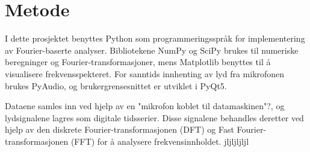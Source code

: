 \section{Metode}
I dette prosjektet benyttes Python som programmeringsspråk for implementering av Fourier-baserte analyser. Bibliotekene NumPy og SciPy brukes til numeriske beregninger og Fourier-transformasjoner, mens Matplotlib benyttes til å visualisere frekvensspekteret. For sanntids innhenting av lyd fra mikrofonen brukes PyAudio, og brukergrensesnittet er utviklet i PyQt5. 

Dataene samles inn ved hjelp av en "mikrofon koblet til datamaskinen"?, og lydsignalene lagres som digitale tidsserier. Disse signalene behandles deretter ved hjelp av den diskrete Fourier-transformasjonen (DFT) og Fast Fourier-transformasjonen (FFT) for å analysere frekvensinnholdet.
jljljljljl